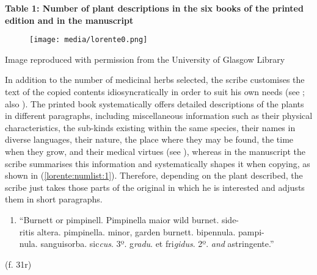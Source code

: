 \documentclass{article}
\begin{document}
\textbf{Table 1: Number of plant descriptions in the six books of the printed edition and in the manuscript}

\begin{figure}
  \centering
  \texttt{[image: media/lorente0.png]}
  \label{fig:lorente0}
\end{figure}


 Image reproduced with permission from the University of Glasgow Library 


 
In addition to the number of medicinal herbs selected, the scribe
customises the text of the copied contents idiosyncratically in order to
suit his own needs (see \cite{de_la_cruz_cabanillas_secrets_2020}; also \cite{barbierato_writing_2011}). The printed book systematically offers detailed descriptions of
the plants in different paragraphs, including miscellaneous information such as their physical characteristics, the sub-kinds existing
within the same species, their names in diverse languages, their nature,
the place where they may be found, the time when they grow, and their
medical virtues (see \cite[137--138]{dodoens_niewe_1578}), whereas in the manuscript
the scribe summarises this information and systematically shapes it when
copying, as shown in (\ref{lorente:numlist:1}). Therefore, depending on the plant described,
the scribe just takes those parts of the original in which he is
interested and adjusts them in short paragraphs.


\begin{enumerate}
\def\labelenumi{(\arabic{enumi})}
\item\label{lorente:numlist:1}
  ``Burnett or pimpinell. Pimpinella maior wild burnet. side-\\
  ritis altera. pimpinella. minor, garden burnett. bipennula. pampi-\\
  nula. sanguisorba. sic\emph{cus}. 3º. g\emph{radu}. et fri\emph{gidus}.
2º. \emph{and} astringente.'' 
\end{enumerate}
\begin{flushright}
    (f. 31r)
\end{flushright}
\end{document}
